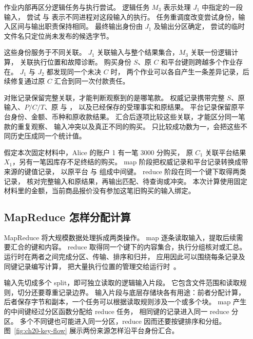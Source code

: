 作业内部再区分逻辑任务与执行尝试。
逻辑任务 $M_3$ 表示处理 $J_1$ 中指定的一段输入，
尝试  与  表示不同进程对这段输入的执行。
任务重调度改变尝试身份，输入区间与输出职责保持相同。
最终输出身份由 $J_1$ 及输出分区确定，
尝试的临时文件名只定位尚未发布的候选字节。

这些身份服务于不同关联。
$J_1$ 关联输入与整个结果集合，$M_3$ 关联一份逻辑计算，
 关联执行位置和故障诊断。
购买身份 $S$、原 $C$ 和平台键则跨越多个作业存在。
$J_1$ 与 $J_2$ 都发现同一个未决 $C$ 时，
两个作业可以各自产生一条差异记录，后续修复通过原 $C$ 汇合到同一次付款责任。


对账记录保留完整关联，才能判断观察到的是哪笔款。
权威记录携带完整 $S$、原输入、$P/C/T$、原  与 ，
以及已经保存的受理事实和原结果。
平台记录保留原平台身份、金额、币种和原收款结果。
汇合后逐项比较这些关联，才能区分同一笔款的重复观察、
输入冲突以及真正不同的购买。
只比较成功数为一，会把这些不同历史压成同一个统计值。

假定本次固定材料中，Alice 的账户 1 有一笔 3000 分购买，
原 $C_1$ 关联平台结果 $X_1$，另有一笔因库存不足终结的购买。
map 阶段把权威记录和平台记录转换成带来源的键值记录，
以原平台  与  组成中间键。
reduce 阶段在同一个键下取得两类记录，
核对完整输入和原结果，再输出匹配、待查询或冲突。
本次计算使用固定材料里的金额，当前商品报价没有参加这笔旧购买的输入绑定。

\subsection{MapReduce 怎样分配计算}

MapReduce 将大规模数据处理拆成两类操作。
map 逐条读取输入，提取后续需要汇合的键和内容。
reduce 取得同一个键下的内容集合，执行分组核对或汇总。
运行时在两者之间完成分区、传输、排序和归并，
应用因此可以围绕每条记录及同键记录编写计算，
把大量执行位置的管理交给运行时~\cite{mapreduce-design}。

输入先切成多个 split，即可独立读取的逻辑输入片段。
它包含文件范围和读取规则，切分还要尊重记录边界。
输入片段与底层存储块各有用途：前者分配计算，
后者保存字节和副本，一个任务可以根据读取规则涉及一个或多个块。
map 产生的中间键经过分区函数分配给 reduce 任务，
相同键的记录进入同一 reduce 分区。
多个不同键也可能进入同一分区，reduce 因而还要按键排序和分组。
图~\ref{fig:ch20-key-flow} 展示两份来源怎样沿平台身份汇合。

